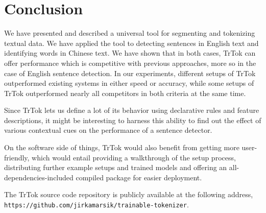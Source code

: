 \section{Conclusion}
\label{sec:outro}

We have presented and described a universal tool for segmenting and
tokenizing textual data. We have applied the tool to detecting
sentences in English text and identifying words in Chinese text. We
have shown that in both cases, TrTok can offer performance which is
competitive with previous approaches, more so in the case of English
sentence detection. In our experiments, different setups of TrTok
outperformed existing systems in either speed or accuracy, while some
setups of TrTok outperformed nearly all competitors in both criteria
at the same time.

Since TrTok lets us define a lot of its behavior using declarative
rules and feature descriptions, it might be interesting to harness
this ability to find out the effect of various contextual cues on the
performance of a sentence detector.

On the software side of things, TrTok would also benefit from getting
more user-friendly, which would entail providing a walkthrough of the
setup process, distributing further example setups and trained models
and offering an all-dependencies-included compiled package for easier
deployment.

The TrTok source code repository is publicly available at the
following address, \\
\texttt{https://github.com/jirkamarsik/trainable-tokenizer}.
